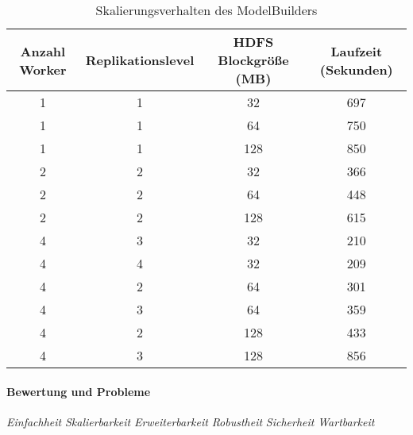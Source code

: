 \begin{table}[ht]
	\caption{Skalierungsverhalten des ModelBuilders} %
	\centering %
	\begin{tabular}{c c c c} %
	\hline\hline %
	Anzahl Worker & Replikationslevel & HDFS Blockgröße (MB) & Laufzeit (Sekunden) \\ [0.5ex] %
	\hline %
	1 & 1 & 32 & 697 \\ %
	1 & 1 & 64 & 750 \\
	1 & 1 & 128 & 850 \\
	2 & 2 & 32 & 366 \\
	2 & 2 & 64 & 448 \\
	2 & 2 & 128 & 615 \\
	4 & 3 & 32 & 210 \\
	4 & 4 & 32 & 209 \\
	4 & 2 & 64 & 301 \\
	4 & 3 & 64 & 359 \\
	4 & 2 & 128 & 433 \\
	4 & 3 & 128 & 856 \\ [1ex] 
	\hline %
	\end{tabular}
	\label{table:scaling} %
\end{table}

\paragraph{Bewertung und Probleme}

\textit{Einfachheit}
\textit{Skalierbarkeit}
\textit{Erweiterbarkeit}
\textit{Robustheit}
\textit{Sicherheit}
\textit{Wartbarkeit}
